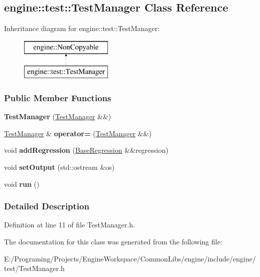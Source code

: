 \hypertarget{a00076}{}\subsection{engine\+:\+:test\+:\+:Test\+Manager Class Reference}
\label{a00076}
Inheritance diagram for engine\+:\+:test\+:\+:Test\+Manager\+:\begin{figure}[H]
\begin{center}
\leavevmode
\includegraphics[height=2.000000cm]{a00076}
\end{center}
\end{figure}
\subsubsection*{Public Member Functions}
\begin{DoxyCompactItemize}
\item 
{\bfseries Test\+Manager} (\hyperlink{a00076}{Test\+Manager} \&\&)\hypertarget{a00076_a1fad10153989c4d6a53986abcb638609}{}\label{a00076_a1fad10153989c4d6a53986abcb638609}

\item 
\hyperlink{a00076}{Test\+Manager} \& {\bfseries operator=} (\hyperlink{a00076}{Test\+Manager} \&\&)\hypertarget{a00076_af3d61f894ab863a0da862c3389da4ec8}{}\label{a00076_af3d61f894ab863a0da862c3389da4ec8}

\item 
void {\bfseries add\+Regression} (\hyperlink{a00006}{Base\+Regression} \&\&regression)\hypertarget{a00076_abfffd17a9a11b7eeea95b7b9d1a74b87}{}\label{a00076_abfffd17a9a11b7eeea95b7b9d1a74b87}

\item 
void {\bfseries set\+Output} (std\+::ostream \&os)\hypertarget{a00076_a5a4b820c91787876c3d0b5ec5d4263d9}{}\label{a00076_a5a4b820c91787876c3d0b5ec5d4263d9}

\item 
void {\bfseries run} ()\hypertarget{a00076_abad9d9606204fb93bbe9d5d88c0df755}{}\label{a00076_abad9d9606204fb93bbe9d5d88c0df755}

\end{DoxyCompactItemize}


\subsubsection{Detailed Description}


Definition at line 11 of file Test\+Manager.\+h.



The documentation for this class was generated from the following file\+:\begin{DoxyCompactItemize}
\item 
E\+:/\+Programing/\+Projects/\+Engine\+Workspace/\+Common\+Libs/engine/include/engine/test/Test\+Manager.\+h\end{DoxyCompactItemize}

